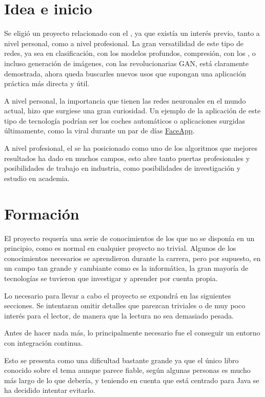 
\section{Idea e inicio}

Se eligió un proyecto relacionado con el , ya que existía un interés previo, tanto a nivel personal, como a nivel profesional. La gran versatilidad de este tipo de redes, ya sea en clasificación, con los modelos profundos, compresión, con los , o incluso generación de imágenes, con las revolucionarias GAN, está claramente demostrada, ahora queda buscarles nuevos usos que supongan una aplicación práctica más directa y útil. 

A nivel personal, la importancia que tienen las redes neuronales en el mundo actual, hizo que surgiese una gran curiosidad. Un ejemplo de la aplicación de este tipo de tecnología podrían ser los coches automáticos o aplicaciones surgidas últimamente, como la viral durante un par de días \href{https://www.faceapp.com/}{FaceApp}. 

A nivel profesional, el  se ha posicionado como uno de los algoritmos que mejores resultados ha dado en muchos campos, esto abre tanto puertas profesionales y posibilidades de trabajo en industria, como posibilidades de investigación y estudio en academia. 



\section{Formación}
El proyecto requería una serie de conocimientos de los que no se disponía en un principio, como es normal en cualquier proyecto no trivial. Algunos de los conocimientos necesarios se aprendieron durante la carrera, pero por supuesto, en un campo tan grande y cambiante como es la informática, la gran mayoría de tecnologías se tuvieron que investigar y aprender por cuenta propia.

Lo necesario para llevar a cabo el proyecto se expondrá en las siguientes secciones. Se intentaran omitir detalles que parezcan triviales o de muy poco interés para el lector, de manera que la lectura no sea demasiado pesada.

Antes de hacer nada más, lo principalmente necesario fue el conseguir un entorno con integración continua. 

Esto se presenta como una dificultad bastante grande ya que el único libro conocido sobre el tema \cite{cont07} aunque parece fiable, según algunas personas es mucho más largo de lo que debería, y teniendo en cuenta que está centrado para Java se ha decidido intentar evitarlo.

